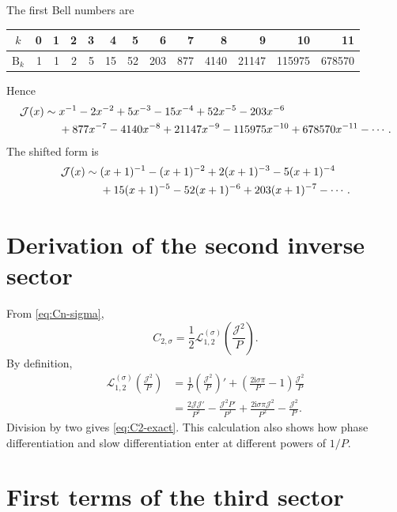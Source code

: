 \documentclass[11pt,a4paper]{article}
\numberwithin{equation}{section}
\theoremstyle{definition}
\theoremstyle{remark}
\newcommand{\ii}{\mathrm i}
\newcommand{\Bell}{\mathrm B}
\newcommand{\Tail}{\mathcal J}
\begin{document}
The first Bell numbers are
\begin{center}
\begin{tabular}{@{}c|rrrrrrrrrrrr@{}}
\toprule
$k$ & 0&1&2&3&4&5&6&7&8&9&10&11\\
\midrule
$\Bell_k$
&1&1&2&5&15&52&203&877&4140&21147&115975&678570\\
\bottomrule
\end{tabular}
\end{center}
Hence
\begin{align}
 \Tail(x)\sim{}&x^{-1}-2x^{-2}+5x^{-3}-15x^{-4}+52x^{-5}
 -203x^{-6}\notag\\
 &+877x^{-7}-4140x^{-8}+21147x^{-9}-115975x^{-10}
 +678570x^{-11}-\cdots.
 \label{eq:J-long}
\end{align}
The shifted form is
\begin{align}
 \Tail(x)\sim{}&(x+1)^{-1}-(x+1)^{-2}+2(x+1)^{-3}
 -5(x+1)^{-4}\notag\\
 &+15(x+1)^{-5}-52(x+1)^{-6}+203(x+1)^{-7}-\cdots.
 \label{eq:J-long-shifted}
\end{align}

\section{Derivation of the second inverse sector}
\label{app:C2-derivation}

From \eqref{eq:Cn-sigma},
\[
 C_{2,\sigma}=\frac12\mathcal L^{(\sigma)}_{1,2}
 \left(\frac{\Tail^2}{P}\right).
\]
By definition,
\begin{align*}
 \mathcal L^{(\sigma)}_{1,2}
 \left(\frac{\Tail^2}{P}\right)
 &=\frac1P\left(\frac{\Tail^2}{P}\right)'
 +\left(\frac{2\ii\sigma\pi}{P}-1\right)
 \frac{\Tail^2}{P}\\
 &=\frac{2\Tail\Tail'}{P^2}
 -\frac{\Tail^2P'}{P^3}
 +\frac{2\ii\sigma\pi\Tail^2}{P^2}
 -\frac{\Tail^2}{P}.
\end{align*}
Division by two gives \eqref{eq:C2-exact}.  This calculation also shows how
phase differentiation and slow differentiation enter at different powers of
$1/P$.

\section{First terms of the third sector}
\label{app:C3}
\end{document}
